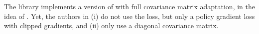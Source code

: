 The library implements a version of \ppo with full covariance matrix adaptation, in the idea of \cite{ppocma}. Yet, the authors in \cite{ppocma} (i) do not use the \ppo loss, but only a policy gradient loss with clipped gradients, and (ii) only use a diagonal covariance matrix.








%

